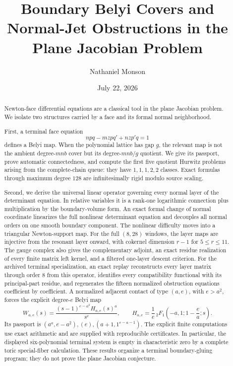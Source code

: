 \documentclass[11pt,reqno]{amsart}
\title[Boundary Belyi covers and normal jets]{Boundary Belyi Covers and
Normal-Jet Obstructions in the Plane Jacobian Problem}
\author{Nathaniel Monson}
\date{July 22, 2026}
\begin{document}
\begin{abstract}
Newton-face differential equations are a classical tool in the plane
Jacobian problem.  We isolate two structures carried by a face and its
formal normal neighborhood.

First, a terminal face equation
\[
npq-mzpq'+nzp'q=1
\]
defines a Belyi map.  When the polynomial lattice has gap \(g\), the relevant
map is not the ambient degree-\(mnb\) cover but its degree-\(mnb/g\)
quotient.  We give its passport, prove automatic connectedness, and compute
the first five quotient Hurwitz problems arising from the complete-chain
queue: they have \(1,1,1,2,2\) classes.  Exact formulas through maximum
degree \(128\) are infinitesimally rigid modulo source scaling.

Second, we derive the universal linear operator governing every normal
layer of the determinant equation.  In relative variables it is a rank-one
logarithmic connection plus multiplication by the boundary-volume form.
An exact formal change of normal coordinate linearizes the full nonlinear
determinant equation and decouples all normal orders on one smooth boundary
component.  The nonlinear difficulty moves into a triangular Newton-support
map.  For the full \((8,28)\) windows, the layer maps are injective from the
resonant layer onward, with cokernel dimension \(r-1\) for
\(5\le r\le11\).  The gauge complex also gives the complementary adjoint,
an exact residue realization of every finite matrix left kernel, and a
filtered one-layer descent criterion.  For the archived terminal
specialization, an exact replay reconstructs every layer matrix through
order \(8\) from this operator, identifies every compatibility functional
with its principal-part residue, and regenerates the fifteen normalized
obstruction equations coefficient by coefficient.  A normalized adjacent contact of
type \((a,e)\), with \(e>a^2\), forces the explicit degree-\(e\) Belyi map
\[
W_{a,e}(s)=\frac{(s-1)^{e-a^2}H_{a,e}(s)^a}{s^e},
\qquad
H_{a,e}=\frac1e\,{}_2F_1\!\left(-a,1;1-\frac ea;s\right).
\]
Its passport is
\((a^a,e-a^2),(e),(a+1,1^{e-a-1})\).
The explicit finite computations use exact arithmetic and are supplied with
reproducible certificates.  In particular, the displayed six-polynomial
terminal system is empty in characteristic zero by a complete toric
special-fiber calculation.  These results organize a terminal
boundary-gluing program; they do not prove the plane Jacobian conjecture.
\end{abstract}

\maketitle
\end{document}
